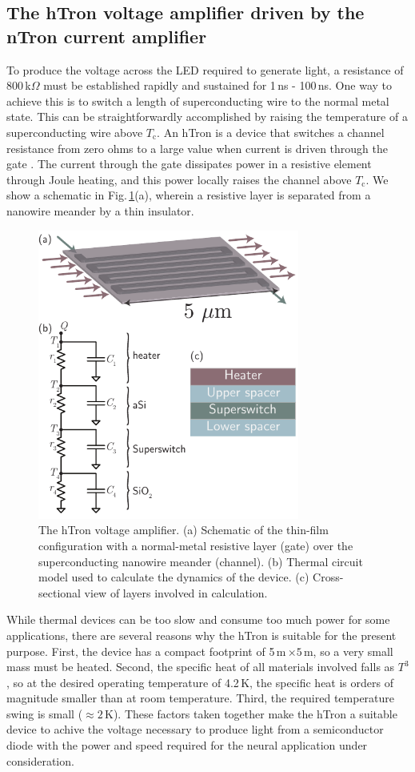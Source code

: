 \documentclass[twocolumn]{article}
\begin{document}
\subsection{\label{sec:hTron}The hTron voltage amplifier driven by the nTron current amplifier}
To produce the voltage across the LED required to generate light, a resistance of 800\,k$\Omega$ must be established rapidly and sustained for 1\,ns - 100\,ns. One way to achieve this is to switch a length of superconducting wire to the normal metal state. This can be straightforwardly accomplished by raising the temperature of a superconducting wire above $T_{\mathrm{c}}$. An hTron is a device that switches a channel resistance from zero ohms to a large value when current is driven through the gate \cite{zhto2018}. The current through the gate dissipates power in a resistive element through Joule heating, and this power locally raises the channel above $T_{\mathrm{c}}$. We show a schematic in Fig.\,\ref{fig:transmitters_hTron_circuit}(a), wherein a resistive layer is separated from a nanowire meander by a thin insulator. 
\begin{figure}[t!]
	\centerline{\includegraphics[width=8.6cm]{_transmitters_hTron_circuit_small.pdf}}
	\caption{\label{fig:transmitters_hTron_circuit}The hTron voltage amplifier. (a) Schematic of the thin-film configuration with a normal-metal resistive layer (gate) over the superconducting nanowire meander (channel). (b) Thermal circuit model used to calculate the dynamics of the device. (c) Cross-sectional view of layers involved in calculation.}
\end{figure}

While thermal devices can be too slow and consume too much power for some applications, there are several reasons why the hTron is suitable for the present purpose. First, the device has a compact footprint of 5\,\textmu m\,$\times 5$\,\textmu m, so a very small mass must be heated. Second, the specific heat of all materials involved falls as $T^3$, so at the desired operating temperature of 4.2\,K, the specific heat is orders of magnitude smaller than at room temperature. Third, the required temperature swing is small ($\approx 2$\,K). These factors taken together make the hTron a suitable device to achive the voltage necessary to produce light from a semiconductor diode with the power and speed required for the neural application under consideration.
\end{document}
